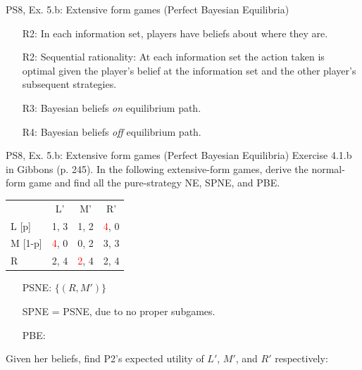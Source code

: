 \begin{frame}{PS8, Ex. 5.b: Extensive form games (Perfect Bayesian Equilibria)}
\begin{multicols}{2}
      \begin{itemize}
        \item[R2:] In each information set, players have beliefs about where they are.
        \item[R2:] Sequential rationality: At each information set the action taken is optimal given the player's belief at the information set and the other player's subsequent strategies.
        \item[R3:] Bayesian beliefs \textit{on} equilibrium path.
        \item[R4:] Bayesian beliefs \textit{off} equilibrium path.
      \end{itemize}
      \vfill\null
    \end{multicols}
\end{frame}
\begin{frame}{PS8, Ex. 5.b: Extensive form games (Perfect Bayesian Equilibria)}
    Exercise 4.1.b in Gibbons (p. 245). In the following extensive-form games, derive the normal-form game and find all the pure-strategy NE, SPNE, and PBE.
    \vspace{-8pt}
    \begin{multicols}{2}
      \begin{table}
        \begin{tabular}{l|c|c|c|}
          \multicolumn{1}{c}{} & \multicolumn{1}{c}{L'} & \multicolumn{1}{c}{M'} & \multicolumn{1}{c}{R'} \\\cline{2-4}
          L [p]   & 1, \color{blue}3 & 1, 2 & \textcolor{red}{4}, 0 \\\cline{2-4}
          M [1-p] & \textcolor{red}{4}, 0 & 0, 2 & 3, \color{blue}3 \\\cline{2-4}
          R       & 2, \color{blue}4 & \textcolor{red}{2}, \color{blue}4 & 2, \color{blue}4 \\\cline{2-4}
        \end{tabular}
      \end{table} \vspace{-4pt}
      \begin{itemize}
        \item[PSNE:] $\{(R,M')\}$
        \item[SPNE =] PSNE, due to no proper subgames.
        \item[PBE:]
      \end{itemize} \vspace{-4pt}
      Given her beliefs, find P2's expected utility of $L'$, $M'$, and $R'$ respectively: \vspace{-4pt}

\end{multicols}
\end{frame}
